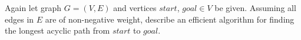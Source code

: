 Again let graph $G=(V,E)$ and vertices $start$, $goal \in  V$ be given.  
Assuming all edges in $E$ are of non-negative
weight, describe an efficient algorithm for finding the longest acyclic path from
$start$ to $goal$.
